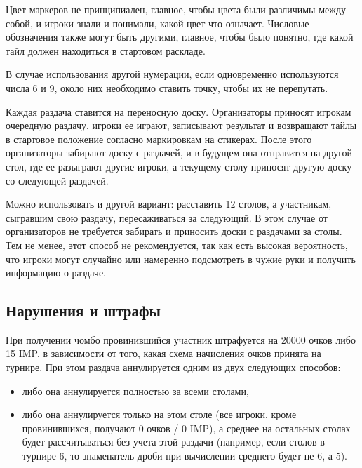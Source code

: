 \begin{additional}
Цвет маркеров не принципиален, главное, чтобы цвета были различимы между собой, и игроки знали и понимали, какой цвет что означает. Числовые обозначения также могут быть другими, главное, чтобы было понятно, где какой тайл должен находиться в стартовом раскладе.

В случае использования другой нумерации, если одновременно используются числа 6 и 9, около них необходимо ставить точку, чтобы их не перепутать.

\vspace{0.3cm}

Каждая раздача ставится на переносную доску. Организаторы приносят игрокам очередную раздачу, игроки ее играют, записывают результат и возвращают тайлы в стартовое положение согласно маркировкам на стикерах. После этого организаторы забирают доску с раздачей, и в будущем она отправится на другой стол, где ее разыграют другие игроки, а текущему столу приносят другую доску со следующей раздачей.

\vspace{0.3cm}

Можно использовать и другой вариант: расставить 12 столов, а участникам, сыгравшим свою раздачу, пересаживаться за следующий. В этом случае от организаторов не требуется забирать и приносить доски с раздачами за столы. Тем не менее, этот способ не рекомендуется, так как есть высокая вероятность, что игроки могут случайно или намеренно подсмотреть в чужие руки и получить информацию о раздаче.

\subsection{Нарушения и штрафы}

При получении чомбо провинившийся участник штрафуется на 20000 очков либо 15 IMP, в зависимости от того, какая схема начисления очков принята на турнире. При этом раздача аннулируется одним из двух следующих способов:

\begin{itemize}
	\item либо она аннулируется полностью за всеми столами,
	\item либо она аннулируется только на этом столе (все игроки, кроме провинившихся, получают 0 очков / 0 IMP), а среднее на остальных столах будет рассчитываться без учета этой раздачи (например, если столов в турнире 6, то знаменатель дроби при вычислении среднего будет не 6, а 5).
\end{itemize}


\end{additional}
